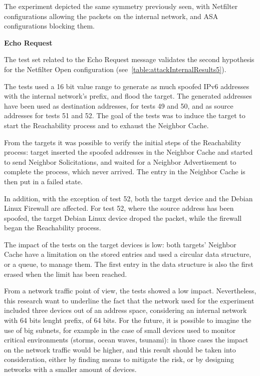 \documentclass[12pt]{article}
\begin{document}
The experiment depicted the same symmetry previously seen, with Netfilter configurations allowing the packets on the internal network, and ASA configurations blocking them.

\textbf{Echo Request}

The test set related to the Echo Request message validates the second hypothesis for the Netfilter Open configuration (see~\cref{table:attackInternalResults5}).

The tests used a 16 bit value range to generate as much spoofed IPv6 addresses with the internal network's prefix, and flood the target. The generated addresses have been used as destination addresses, for tests 49 and 50, and as source addresses for tests 51 and 52. The goal of the tests was to induce the target to start the Reachability process and to exhaust the Neighbor Cache.

From the targets it was possible to verify the initial steps of the Reachability process: target inserted the spoofed addresses in the Neighbor Cache and started to send Neighbor Solicitations, and waited for a Neighbor Advertisement to complete the process, which never arrived. The entry in the Neighbor Cache is then put in a failed state.

In addition, with the exception of test 52, both the target device and the Debian Linux Firewall are affected. For test 52, where the source address has been spoofed, the target Debian Linux device droped the packet, while the firewall began the Reachability process.

The impact of the tests on the target devices is low: both targets' Neighbor Cache have a limitation on the stored entries and used a circular data structure, or a queue, to manage them. The first entry in the data structure is also the first erased when the limit has been reached. 

From a network traffic point of view, the tests showed a low impact. Nevertheless, this research want to underline the fact that the network used for the experiment included three devices out of an address space, considering an internal network with 64 bits lenght prefix, of 64 bits. For the future, it is possible to imagine the use of big subnets, for example in the case of small devices used to monitor critical environments (storms, ocean waves, tsunami): in those cases the impact on the network traffic would be higher, and this result should be taken into consideration, either by finding means to mitigate the risk, or by designing networks with a smaller amount of devices.
\end{document}
